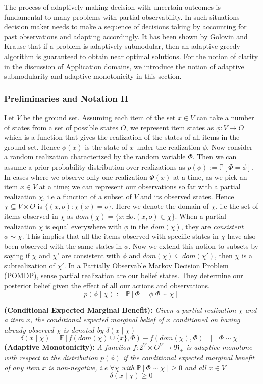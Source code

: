 The process of adaptively making decision with uncertain outcomes is fundamental to many problems with partial observability. In such situations decision maker needs to make a sequence of decisions taking by accounting for past observations and adapting accordingly. It has been shown by Golovin and Krause \cite{Golovin} that if a problem is adaptively submodular, then an adaptive greedy algorithm is guaranteed to obtain near optimal solutions.
For the notion of clarity in the discussion of Application domains, we introduce the notion of adaptive submodularity and adaptive monotonicity in this section.

\subsubsection{Preliminaries and Notation II}
Let $V$ be the ground set. Assuming each item of the set $x\in V$ can take a number of states from a set of possible states $O$, we represent item states as $\phi:V \rightarrow O$ which is a function that gives the realization of the states of all items in the ground set. Hence $\phi(x)$ is the state of $x$ under the realization $\phi$. Now consider a random realization characterized by the random variable $\Phi$. Then we can assume a prior probability distribution over realizations as $p(\phi) := \mathbb{P}[\Phi = \phi]$. 
In cases where we observe only one realization $\Phi(x)$ at a time, as we pick an item $x \in V$ at a time; we can represent our observations so far with a partial realization $\chi$, i.e a function of a subset of $V$ and its observed states. Hence $\chi \subseteq V \times O$ is $\{(x,o):\chi(x) = o\}$. Here we denote the domain of $\chi$, i.e the set of items observed in $\chi$ as $dom(\chi) = \{ x: \exists o.(x,o) \in \chi \}$. When a partial realization $\chi$ is equal everywhere with $\phi$ in the $dom(\chi)$, they are {\it consistent} $\phi \sim \chi$.
This implies that all the items observed with specific states in $\chi$ have also been observed with the same states in $\phi$. Now we extend this notion to subsets by saying if $\chi$ and $\chi'$ are consistent with $\phi$ and $dom(\chi)\subseteq dom(\chi')$, then $\chi$ is a subrealization of $\chi'$. In a Partially Observable Markov Decision Problem (POMDP), sense partial realization are our belief states. They determine our posterior belief given the effect of all our actions and observations.
\[
 p(\phi\mid\chi) := \mathbb{P}[\Phi=\phi | \Phi \sim \chi]
\]

{\bf {} (Conditional Expected Marginal Benefit):} 
{\it Given a partial realization $\chi$ and a item $x$, the conditional expected marginal belief of $x$ conditioned on having already observed $\chi$ is denoted by $\delta(x\mid\chi)$
\[
 \delta(x\mid\chi) = \mathbb{E}[f(dom(\chi)\cup\{x\},\Phi) - f(dom(\chi),\Phi) \text{ } \mid \text{ } \Phi \sim \chi]
\]
}
{\bf {} (Adaptive Monotonicity):}
{\it A function $f:2^V \times O^V \rightarrow \Re_+$ is adaptive monotone with respect to the distribution $p(\phi)$ if the conditional expected marginal benefit of any item $x$ is non-negative, i.e $\forall \chi$ with $\mathbb{P}[\Phi \sim \chi] \geq 0$ and all $x\in V$ }
\[
 \delta(x\mid\chi) \geq 0
\]

